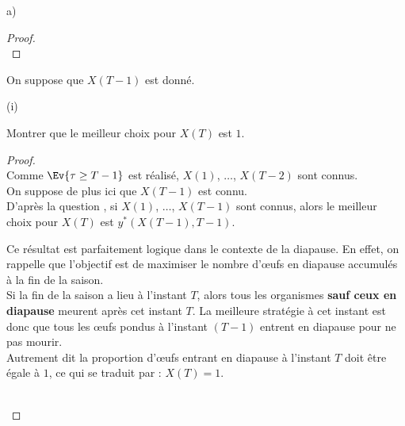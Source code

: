 \begin{noliste}{a)}
\begin{proof}
      ~\\[-.8cm]
    \end{proof}
    
    \item On suppose que $X(T-1)$ est donné.
    \begin{nonoliste}{(i)}
      \item Montrer que le meilleur choix pour $X(T)$ est $1$.
      
      \begin{proof}~\\
        Comme $\Ev{\tau \geq T-1}$ est réalisé, $X(1)$, $\ldots$, 
        $X(T-2)$ sont connus.\\
        On suppose de plus ici que $X(T-1)$ est connu.\\
        D'après la question , si $X(1)$, $\ldots$, $X(T-1)$
        sont connus, alors le meilleur choix pour $X(T)$ est 
        $y^*(X(T-1),T-1)$.
        
        \begin{remark}
          Ce résultat est parfaitement logique dans le contexte de la 
          diapause. En effet, on rappelle que l'objectif est de 
          maximiser le nombre d'{\oe}ufs en diapause accumulés à la fin 
	  de la saison.\\
          Si la fin de la saison a lieu à l'instant
          $T$, alors tous les organismes {\bf sauf ceux en 
          diapause} meurent après cet instant $T$. La meilleure 
	  stratégie à cet instant est donc 
          que tous les {\oe}ufs pondus à l'instant $(T-1)$ entrent 
          en diapause pour ne pas mourir.\\
          Autrement dit la proportion d'{\oe}ufs entrant en 
          diapause à l'instant $T$ doit être égale à $1$, ce qui se
          traduit par : $X(T)=1$.
        \end{remark}~\\[-1.4cm]
      \end{proof}


\end{nonoliste}
\end{noliste}
